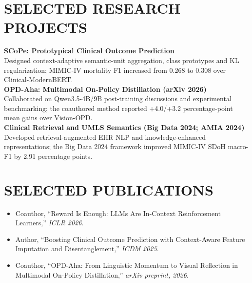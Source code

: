 \documentclass[10pt, letterpaper]{article}
\begin{document}
\section{SELECTED RESEARCH PROJECTS}
\textbf{SCoPe: Prototypical Clinical Outcome Prediction}\\[-1pt]
Designed context-adaptive semantic-unit aggregation, class prototypes and KL regularization; MIMIC-IV mortality F1 increased from 0.268 to 0.308 over Clinical-ModernBERT.\\[3pt]
\textbf{OPD-Aha: Multimodal On-Policy Distillation (arXiv 2026)}\\[-1pt]
Collaborated on Qwen3.5-4B/9B post-training discussions and experimental benchmarking; the coauthored method reported +4.0/+3.2 percentage-point mean gains over Vision-OPD.\\[3pt]
\textbf{Clinical Retrieval and UMLS Semantics (Big Data 2024; AMIA 2024)}\\[-1pt]
Developed retrieval-augmented EHR NLP and knowledge-enhanced representations; the Big Data 2024 framework improved MIMIC-IV SDoH macro-F1 by 2.91 percentage points.\\[3pt]
\section{SELECTED PUBLICATIONS}
\begin{itemize}
\item Coauthor, ``Reward Is Enough: LLMs Are In-Context Reinforcement Learners,'' \textit{ICLR 2026}.
\item Author, ``Boosting Clinical Outcome Prediction with Context-Aware Feature Imputation and Disentanglement,'' \textit{ICDM 2025}.
\item Coauthor, ``OPD-Aha: From Linguistic Momentum to Visual Reflection in Multimodal On-Policy Distillation,'' \textit{arXiv preprint, 2026}.
\end{itemize}
\end{document}
